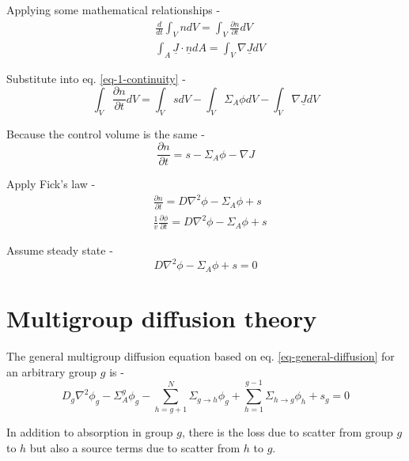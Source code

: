\documentclass[11pt,a4paper]{article}
\begin{document}
\noindent Applying some mathematical relationships - 
\begin{equation}
    \begin{split}
        & \frac{d}{dt} \int_V ndV = \int_V \frac{\partial n}{\partial t} dV \\
        & \int_A \underline{J} \cdot \underline{n} dA = \int_V \nabla \underline{J} dV
    \end{split}
\end{equation}

\noindent Substitute into eq. \ref{eq-1-continuity} - 
\begin{equation}
    \int_V \frac{\partial{n}}{\partial{t}} dV = \int_V s dV - \int_V \Sigma_A\phi dV - \int_V \nabla \underline{J} dV
\end{equation}

\noindent Because the control volume is the same - 
\begin{equation} \label{eq-continuity}
    \frac{\partial{n}}{\partial{t}}=s-\Sigma_A\phi-\nabla{J}
\end{equation}

\noindent Apply Fick's law - 
\begin{equation}
    \begin{split}
        & \frac{\partial{n}}{\partial{t}}=D\nabla^2{\phi}-\Sigma_A\phi+s \\
        & \frac{1}{v}\frac{\partial{\phi}}{\partial{t}}=D\nabla^2{\phi}-\Sigma_A\phi+s
    \end{split}
\end{equation}

\noindent Assume steady state - 
\begin{equation} \label{eq-general-diffusion}
    D\nabla^2{\phi}-\Sigma_A\phi+s=0
\end{equation}

\section{Multigroup diffusion theory}
\noindent The general multigroup diffusion equation based on eq. \ref{eq-general-diffusion} for an arbitrary group $g$ is - 
\begin{equation} \label{eq-multigroup-diffusion}
    D_g\nabla^2{\phi_g}-\Sigma_A^g\phi_g-\sum_{h=g+1}^N{\Sigma_{g \rightarrow h}\phi_g}+\sum_{h=1}^{g-1}{\Sigma_{h \rightarrow g}\phi_h}+s_g=0
\end{equation}

\noindent In addition to absorption in group $g$, there is the loss due to scatter from group $g$ to $h$ but also a source terms due to scatter from $h$ to $g$.
\end{document}
